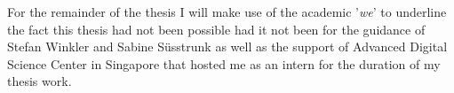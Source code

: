 For the remainder of the thesis I will make use of the academic 
'\emph{we}' to underline the fact this thesis had not been possible had 
it not been for the guidance of Stefan Winkler and Sabine S\"usstrunk as 
well as the support of Advanced Digital Science Center in Singapore that 
hosted me as an intern for the duration of my thesis work. 
